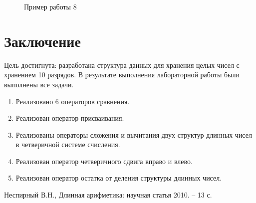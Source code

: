 \documentclass[12pt, a4paper]{article}
\begin{document}
\begin{enumerate}
\begin{figure}[h]
  		\caption{Пример работы 8}
  		\label{img:grap8}
	\end{figure}
\end{enumerate}
\newpage
\section*{Заключение}
Цель достигнута: разработана структура данных для хранения целых чисел с 
хранением 10 разрядов. В результате выполнения лабораторной работы были 
выполнены все задачи.
\begin{enumerate}
\item Реализовано 6 операторов сравнения.
\item Реализован оператор присваивания.
\item Реализованы операторы сложения и вычитания 
двух структур длинных чисел в четверичной системе 
счисления.
\item Реализован оператор четверичного сдвига 
вправо и влево.
\item Реализован оператор остатка от деления 
структуры длинных чисел.
\end{enumerate}
\newpage
\begin{center}
\begin{thebibliography}{}
Неспирный В.Н., Длинная арифметика: научная статья 2010. – 
13 с.
\end{thebibliography}
\end{center}
\end{document}
